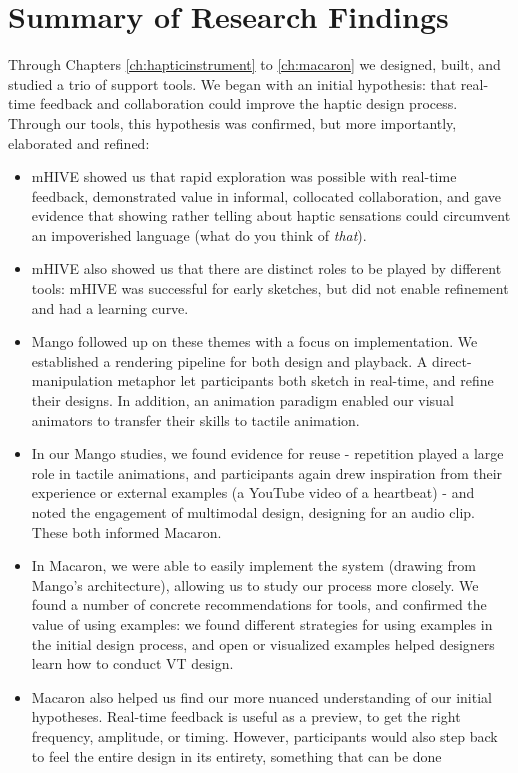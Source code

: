 \section{Summary of Research Findings}
Through Chapters \ref{ch:hapticinstrument} to \ref{ch:macaron} we designed, built, and studied a trio of \haxd support tools.
We began with an initial hypothesis: that real-time feedback and collaboration could improve the haptic design process.
Through our tools, this hypothesis was confirmed, but more importantly, elaborated and refined:
\begin{itemize}
	\item mHIVE showed us that rapid exploration was possible with real-time feedback, demonstrated value in informal, collocated collaboration, and gave evidence that showing rather telling about haptic sensations could circumvent an impoverished language (\eg what do you think of \emph{that}).
	\item mHIVE also showed us that there are distinct roles to be played by different tools: mHIVE was successful for early sketches, but did not enable refinement and had a learning curve.
	\item Mango followed up on these themes with a focus on implementation. We established a rendering pipeline for both design and playback. A direct-manipulation metaphor let participants both sketch in real-time, and refine their designs. In addition, an animation paradigm enabled our visual animators to transfer their skills to tactile animation.
	\item In our Mango studies, we found evidence for reuse - repetition played a large role in tactile animations, and participants again drew inspiration from their experience or external examples (\eg a YouTube video of a heartbeat) - and noted the engagement of multimodal design, \eg designing for an audio clip. These both informed Macaron.
	\item In Macaron, we were able to easily implement the system (drawing from Mango's architecture), allowing us to study our process more closely. We found a number of concrete recommendations for \haxd tools, and confirmed the value of using examples: we found different strategies for using examples in the initial design process, and open or visualized examples helped designers learn how to conduct VT design.
	\item Macaron also helped us find our more nuanced understanding of our initial hypotheses. Real-time feedback is useful as a preview, to get the right frequency, amplitude, or timing. However, participants would also step back to feel the entire design in its entirety, something that can be done
\end{itemize}

